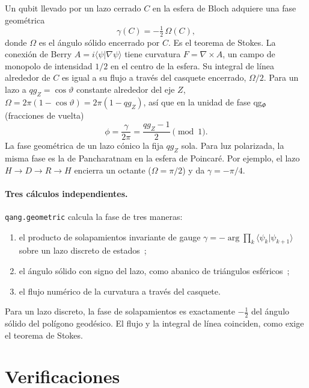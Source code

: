 \documentclass[11pt]{article}
\begin{document}
Un qubit llevado por un lazo cerrado $C$ en la esfera de Bloch adquiere una fase
geométrica~\cite{pancharatnam1956,berry1984}
\begin{equation}
\gamma(C)=-\tfrac12\,\Omega(C),
\end{equation}
donde $\Omega$ es el ángulo sólido encerrado por $C$. Es el teorema de Stokes. La conexión de Berry
$A=i\langle\psi|\nabla\psi\rangle$ tiene curvatura $F=\nabla\times A$, un campo de monopolo de intensidad $1/2$ en
el centro de la esfera. Su integral de línea alrededor de $C$ es igual a su flujo a través del casquete
encerrado, $\Omega/2$. Para un lazo a $qg_Z=\cos\vartheta$ constante alrededor del eje $Z$,
$\Omega=2\pi(1-\cos\vartheta)=2\pi(1-qg_Z)$, así que en la unidad de fase qg$_\Phi$ (fracciones de vuelta)
\begin{equation}
\phi=\frac{\gamma}{2\pi}=\frac{qg_Z-1}{2}\pmod 1 .
\end{equation}
La fase geométrica de un lazo cónico la fija $qg_Z$ sola. Para luz polarizada, la misma fase es la de
Pancharatnam en la esfera de Poincaré. Por ejemplo, el lazo $H\to D\to R\to H$ encierra un octante
($\Omega=\pi/2$) y da $\gamma=-\pi/4$.

\paragraph{Tres cálculos independientes.} \texttt{qang.geometric} calcula la fase de tres maneras:
\begin{enumerate}
\item el producto de solapamientos invariante de gauge $\gamma=-\arg\prod_k\langle\psi_k|\psi_{k+1}\rangle$ sobre
  un lazo discreto de estados~\cite{samuel1988};
\item el ángulo sólido con signo del lazo, como abanico de triángulos esféricos~\cite{vanoosterom1983};
\item el flujo numérico de la curvatura a través del casquete.
\end{enumerate}
Para un lazo discreto, la fase de solapamientos es exactamente $-\tfrac12$ del ángulo sólido del polígono
geodésico. El flujo y la integral de línea coinciden, como exige el teorema de Stokes.

\section{Verificaciones}
\end{document}
